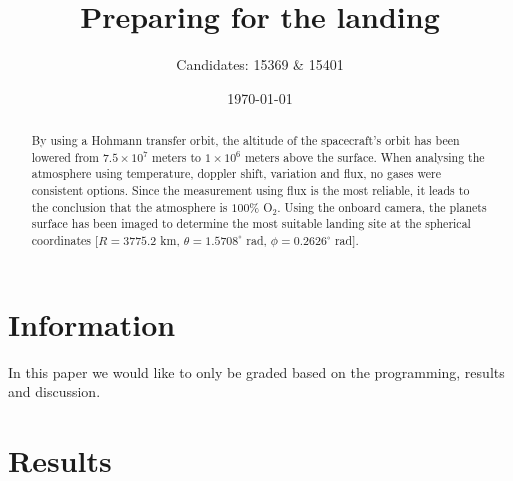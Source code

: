 \documentclass[reprint,english,notitlepage]{revtex4-2}
\begin{document}
\title{Preparing for the landing}
\author{Candidates: 15369 \& 15401}
\date{\today}

\begin{abstract}
    By using a Hohmann transfer orbit, the altitude of the spacecraft's orbit has been lowered from $7.5 \times 10^7$ meters to $1 \times 10^6$ meters above the surface.
    When analysing the atmosphere using temperature, doppler shift, variation and flux, no gases were consistent options.
    Since the measurement using flux is the most reliable, it leads to the conclusion that the atmosphere is $100\%$ O$_2$.
    Using the onboard camera, the planets surface has been imaged to determine the most suitable landing site at the spherical coordinates [$R = 3775.2$ km, $\theta = 1.5708^{\circ}$ rad, $\phi = 0.2626^{\circ}$ rad].
\end{abstract}

\maketitle
\onecolumngrid
\section{Information} \label{sec:info}
\begin{center}
    In this paper we would like to only be graded based on the programming, results and discussion.
\end{center}

\section{Results} \label{sec: results}
\end{document}
